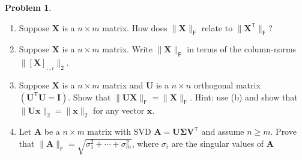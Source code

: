 \documentclass[12pt]{article}
\theoremstyle{definition}
\newtheorem{problem}{Problem}
\renewcommand{\vec}{\mathbf}
\newcommand{\T}{\mathsf{T}}
\newcommand{\F}{\mathsf{F}}
\begin{document}
\begin{problem}~
    \begin{enumerate}
        \item 
            Suppose $\vec{X}$ is a $n\times m$ matrix. 
            How does $\|\vec{X}\|_\F$ relate to $\|\vec{X}^\T\|_\F$?
        \item 
            Suppose $\vec{X}$ is a $n\times m$ matrix. 
            Write $\|\vec{X}\|_\F$ in terms of the column-norms $\|[\vec{X}]_{:,i}\|_2$.
        \item Suppose $\vec{X}$ is a $n\times m$ matrix and $\vec{U}$ is a $n\times n$ orthogonal matrix $(\vec{U}^\T \vec{U} = \vec{I})$.
            Show that $\|\vec{U} \vec{X}\|_\F = \| \vec{X} \|_\F$. 
            Hint: use (b) and show that $\|\vec{U} \vec{x}\|_2 = \|\vec{x}\|_2$ for any vector $\vec{x}$.
        \item Let $\vec{A}$ be a $n\times m$ matrix with SVD $\vec{A} = \vec{U}\vec{\Sigma}\vec{V}^\T$ and assume $n\geq m$.
            Prove that $\|\vec{A}\|_\F = \sqrt{\sigma_1^2 + \cdots + \sigma_m^2}$, where $\sigma_i$ are the singular values of $\vec{A}$
    \end{enumerate}
\end{problem}
\end{document}
